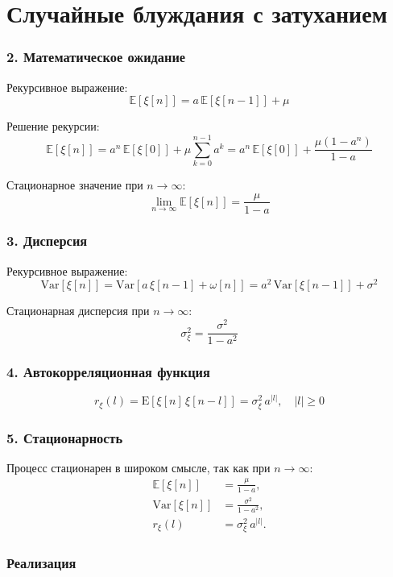 \chapter{Случайные блуждания с затуханием}
\label{ch:chap4}

\subsection*{2. Математическое ожидание}
Рекурсивное выражение:
\[
\mathbb{E}[\xi[n]] = a \, \mathbb{E}[\xi[n-1]] + \mu
\]

Решение рекурсии:
\[
\mathbb{E}[\xi[n]] = a^n \, \mathbb{E}[\xi[0]] + \mu \sum_{k=0}^{n-1} a^k
= a^n \, \mathbb{E}[\xi[0]] + \frac{\mu (1 - a^n)}{1 - a}
\]

Стационарное значение при \(n \to \infty\):
\[
\lim_{n \to \infty} \mathbb{E}[\xi[n]] = \frac{\mu}{1 - a}
\]

\subsection*{3. Дисперсия}
Рекурсивное выражение:
\[
\mathrm{Var}[\xi[n]] = \mathrm{Var}[a \,\xi[n-1] + \omega[n]] = a^2 \, \mathrm{Var}[\xi[n-1]] + \sigma^2
\]

Стационарная дисперсия при \(n \to \infty\):
\[
\sigma_\xi^2 = \frac{\sigma^2}{1 - a^2}
\]

\subsection*{4. Автокорреляционная функция}
\[
r_\xi(l) = \mathrm{E}[\xi[n] \, \xi[n-l]] = \sigma_\xi^2 \, a^{|l|}, \quad |l| \ge 0
\]

\subsection*{5. Стационарность}
Процесс стационарен в широком смысле, так как при \(n \to \infty\):
\[
\begin{aligned}
\mathbb{E}[\xi[n]] &= \frac{\mu}{1 - a}, \\
\mathrm{Var}[\xi[n]] &= \frac{\sigma^2}{1 - a^2}, \\
r_\xi(l) &= \sigma_\xi^2 \, a^{|l|}.
\end{aligned}
\]

\subsection*{Реализация}

